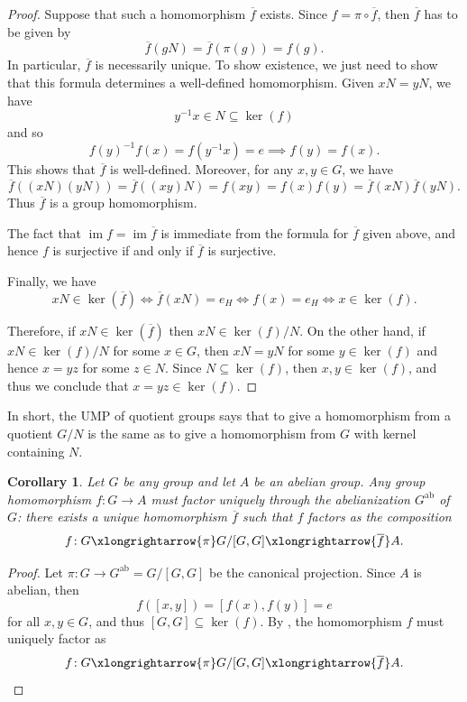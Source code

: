 \documentclass[12pt]{report}
\newtheorem{corollary}[theorem]{Corollary}
\numberwithin{equation}{section}
\numberwithin{theorem}{chapter}
\theoremstyle{definition}
\newtheorem*{basic properties}{Basic Properties}
\newtheorem*{Important Remark}{Important Remark}
\renewcommand{\ker}{\operatorname{ker}}
\DeclareMathOperator{\im}{im}
\begin{document}
\begin{proof}
Suppose that such a homomorphism $\overline{f}$ exists. 
Since $f=\pi\circ \overline f$, then $\overline{f}$ has to be given by 
$$\overline{f}(gN) = \overline{f}(\pi(g)) = f(g).$$
In particular, $\overline f$ is necessarily unique. To show existence, we just need to show that this formula determines a well-defined homomorphism. Given $xN = yN$, we have
$$y^{-1}x \in N \subseteq \ker(f)$$ 
and so 
$$f(y)^{-1} f(x) = f(y^{-1}x) = e \implies f(y) = f(x).$$ 
This shows that $\overline{f}$ is well-defined. Moreover, for any $x,y \in G$, we have
$$\overline{f}((xN)(yN)) = \overline{f}((xy)N) = f(xy) = f(x)f(y) =\overline{f}(xN) \overline{f}(yN).$$
Thus $\overline{f}$ is a group homomorphism.

The fact that $\im f=\im \overline f$ is immediate from the formula for $\overline f$ given above, and hence $f$ is surjective if and only if $\overline f$ is surjective.

Finally, we have 
$$xN \in \ker (\overline{f}) \iff \overline{f}(xN) = e_H \iff f(x) = e_H \iff x \in \ker(f).$$ 

Therefore, if $xN \in \ker (\overline{f})$ then $xN \in  \ker(f)/N$.
On the other hand, if $xN \in \ker(f)/N$ for some $x \in G$, then $xN = yN$ for some $y \in \ker(f)$ and hence $x = yz$ for some $z \in N$. Since $N \subseteq \ker(f)$, then $x, y \in \ker(f)$, and thus we conclude that $x = yz \in \ker(f)$.
\end{proof}


In short, the UMP of quotient groups says that to give a homomorphism from a quotient $G/N$ is the same as to give a homomorphism from $G$ with kernel containing $N$.



\begin{corollary}
Let $G$ be any group and let $A$ be an abelian group.
Any group homomorphism $f\!: G \to A$ must factor uniquely through the abelianization $G^{\textrm{ab}}$ of $G$: there exists a unique homomorphism $\overline{f}$ such that $f$ factors as the composition
$$f\!:G \xlongrightarrow{\pi} G/[G,G] \xlongrightarrow{\overline{f}} A.$$
\end{corollary}

\begin{proof}
	Let $\pi\!: G \to G^\textrm{ab} = G/[G,G]$ be the canonical projection. Since $A$ is abelian, then
$$f([x,y]) = [f(x),f(y)] = e$$ 
for all $x, y \in G$, and thus $[G,G] \subseteq \ker(f)$.
By , the homomorphism $f$ must uniquely factor as
$$f\!:G \xlongrightarrow{\pi} G/[G,G] \xlongrightarrow{\overline{f}} A.\qedhere$$
\end{proof}
\end{document}
